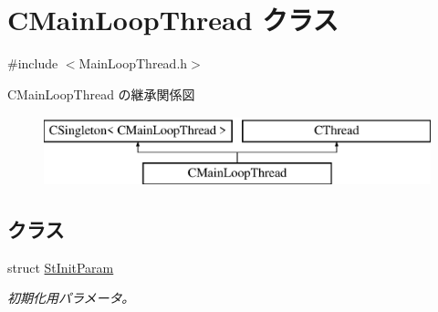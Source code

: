 \hypertarget{class_c_main_loop_thread}{}\section{C\+Main\+Loop\+Thread クラス}
\label{class_c_main_loop_thread}


{\ttfamily \#include $<$Main\+Loop\+Thread.\+h$>$}

C\+Main\+Loop\+Thread の継承関係図\begin{figure}[H]
\begin{center}
\leavevmode
\includegraphics[height=2.000000cm]{class_c_main_loop_thread}
\end{center}
\end{figure}
\subsection*{クラス}
\begin{DoxyCompactItemize}
\item 
struct \hyperlink{struct_c_main_loop_thread_1_1_st_init_param}{St\+Init\+Param}
\begin{DoxyCompactList}\small\item\em 初期化用パラメータ。 \end{DoxyCompactList}\end{DoxyCompactItemize}
